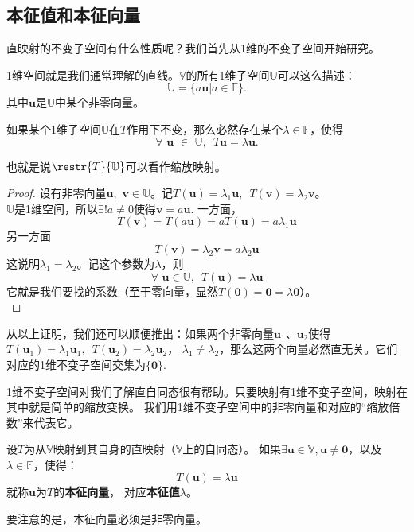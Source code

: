 \documentclass[12pt,UTF8,fontset=none]{ctexbook}
\begin{document}
\subsection{本征值和本征向量}
直映射的不变子空间有什么性质呢？我们首先从1维的不变子空间开始研究。

1维空间就是我们通常理解的直线。$\mathbb{V}$的所有1维子空间$\mathbb{U}$可以这么描述：
$$\mathbb{U} = \{a\mathbf{u} | a \in \mathbb{F}\}.$$
其中$\mathbf{u}$是$\mathbb{U}$中某个非零向量。

\begin{pp}\label{pp:6_1}
    如果某个1维子空间$\mathbb{U}$在$T$作用下不变，那么必然存在某个$\lambda \in \mathbb{F}$，使得
    $$ \forall \,\, \mathbf{u} \,\, \in \,\,\mathbb{U} ,\,\,\, T\mathbf{u} = \lambda\mathbf{u}.$$
\end{pp}
也就是说$\restr{T}{\mathbb{U}}$可以看作缩放映射。
\begin{proof} %
    设有非零向量$\mathbf{u}, \,\, \mathbf{v} \in \mathbb{U}$。记$T(\mathbf{u}) = \lambda_1 \mathbf{u} , \,\,\, T(\mathbf{v}) = \lambda_2 \mathbf{v}$。\\
    $\mathbb{U}$是1维空间，所以$\exists ! a \neq 0$使得$\mathbf{v} = a\mathbf{u}$. 一方面，
    $$ T(\mathbf{v}) = T(a\mathbf{u}) = a T(\mathbf{u}) = a\lambda_1 \mathbf{u}$$
    另一方面
    $$ T(\mathbf{v}) = \lambda_2 \mathbf{v} = a\lambda_2 \mathbf{u}$$
    这说明$\lambda_1 = \lambda_2$。记这个参数为$\lambda$，则
    $$\forall \,\, \mathbf{u} \in \mathbb{U}, \,\,\,T(\mathbf{u}) = \lambda\mathbf{u}$$
    它就是我们要找的系数（至于零向量，显然$T(\mathbf{0}) = \mathbf{0} = \lambda \mathbf{0}$）。\\
\end{proof}

从以上证明，我们还可以顺便推出：如果两个非零向量$\mathbf{u}_1$、$\mathbf{u}_2$使得$T(\mathbf{u}_1) = \lambda_1\mathbf{u}_1, \,\,\, T(\mathbf{u}_2) = \lambda_2\mathbf{u}_2$，
$\lambda_1 \neq \lambda_2$，那么这两个向量必然直无关。它们对应的1维不变子空间交集为$\{\mathbf{0}\}$.

1维不变子空间对我们了解直自同态很有帮助。只要映射有1维不变子空间，映射在其中就是简单的缩放变换。
我们用1维不变子空间中的非零向量和对应的“缩放倍数”来代表它。

\begin{df}\label{df:6_2}
    设$T$为从$\mathbb{V}$映射到其自身的直映射（$\mathbb{V}$上的自同态）。
    如果$\exists \mathbf{u} \in \mathbb{V}, \mathbf{u} \neq \mathbf{0}$，以及$\lambda \in \mathbb{F}$，使得： 
    $$ T(\mathbf{u}) = \lambda \mathbf{u} $$
    就称$\mathbf{u}$为$T$的\textbf{本征向量}，
    对应\textbf{本征值}$\lambda$。
\end{df}
要注意的是，本征向量必须是非零向量。
\end{document}
